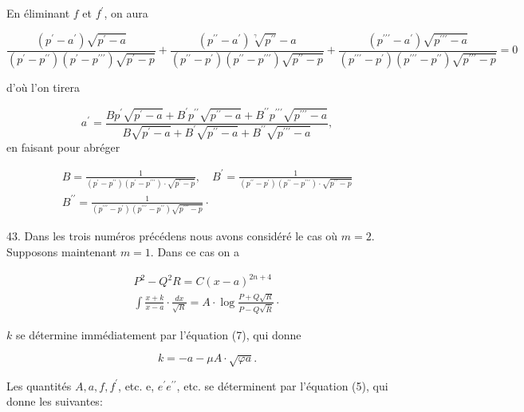 \documentclass{article}
\begin{document}
En éliminant \(f\) et \(f^{\prime}\), on aura

\[
\frac{\left(p^{\prime}-a^{\prime}\right) \sqrt{p^{\prime}-a}}{\left(p^{\prime}-p^{\prime \prime}\right)\left(p^{\prime}-p^{\prime \prime \prime}\right) \sqrt{p^{\prime}-p}}+\frac{\left(p^{\prime \prime}-a^{\prime}\right) \sqrt[\gamma]{p^{\prime \prime}}-a}{\left(p^{\prime \prime}-p^{\prime}\right)\left(p^{\prime \prime}-p^{\prime \prime \prime}\right) \sqrt{p^{\prime \prime}-p}}+\frac{\left(p^{\prime \prime \prime}-a^{\prime}\right) \sqrt{p^{\prime \prime \prime}-a}}{\left(p^{\prime \prime \prime}-p^{\prime}\right)\left(p^{\prime \prime \prime}-p^{\prime \prime}\right) \sqrt{p^{\prime \prime \prime}-p}}=0
\]

d'où l'on tirera

\[
a^{\prime}=\frac{B p^{\prime} \sqrt{p^{\prime}-a}+B^{\prime} p^{\prime \prime} \sqrt{p^{\prime \prime}-a}+B^{\prime \prime} p^{\prime \prime \prime} \sqrt{p^{\prime \prime \prime}-a}}{B \sqrt{p^{\prime}-a}+B^{\prime} \sqrt{p^{\prime \prime}-a}+B^{\prime \prime} \sqrt{p^{\prime \prime \prime}-a}},
\]
en faisant pour abréger

\[
\begin{gathered}
B=\frac{1}{\left(p^{\prime}-p^{\prime \prime}\right)\left(p^{\prime}-p^{\prime \prime \prime}\right) \cdot \sqrt{p^{\prime}-p}}, \quad B^{\prime}=\frac{1}{\left(p^{\prime \prime}-p^{\prime}\right)\left(p^{\prime \prime}-p^{\prime \prime \prime}\right) \cdot \sqrt{p^{\prime \prime}-p}} \\
B^{\prime \prime}=\frac{1}{\left(p^{\prime \prime \prime}-p^{\prime}\right)\left(p^{\prime \prime \prime}-p^{\prime \prime}\right) \sqrt{p^{\prime \prime \prime}-p}} \cdot
\end{gathered}
\]

43. Dans les trois numéros précédens nous avons considéré le cas où \(m=2\). Supposons maintenant \(m=1\). Dans ce cas on a

\[
\begin{gathered}
P^{2}-Q^{2} R=C(x-a)^{2 n+4} \\
\int \frac{x+k}{x-a} \cdot \frac{d x}{\sqrt{R}}=A \cdot \log \frac{P+Q \sqrt{R}}{P-Q \sqrt{\bar{R}}} \cdot
\end{gathered}
\]

\(k\) se détermine immédiatement par l'équation (7), qui donne

\[
k=-a-\mu A \cdot \sqrt{\varphi a} .
\]

Les quantités \(A, a, f, f^{\prime}\), etc. e, \(e^{\prime} e^{\prime \prime}\), etc. se déterminent par l'équation (5), qui donne les suivantes:
\end{document}
